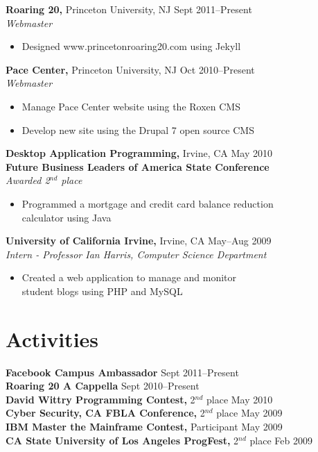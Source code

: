 \documentclass[margin]{res}
\begin{document}
\begin{resume}
 {\bf Roaring 20,} Princeton University, NJ \hfill Sept 2011--Present \\
 {\it Webmaster}
 \begin{itemize} \itemsep -2pt  %
 \item Designed www.princetonroaring20.com using Jekyll
 \end{itemize}

 {\bf Pace Center,} Princeton University, NJ \hfill Oct 2010--Present \\
 {\it Webmaster}
 \begin{itemize} \itemsep -2pt  %
 \item Manage Pace Center website using the Roxen CMS
 \item Develop new site using the Drupal 7 open source CMS
 \end{itemize}
 
 {\bf Desktop Application Programming,} Irvine, CA \hfill May 2010 \\
 {\bf Future Business Leaders of America State Conference} \\
 {\it Awarded 2$^{nd}$ place}
 \begin{itemize} \itemsep -2pt  %
 \item Programmed a mortgage and credit card balance reduction \\ 
   calculator using Java
 \end{itemize}

 {\bf University of California Irvine,} Irvine, CA \hfill May--Aug
 2009 \\
 {\it Intern - Professor Ian Harris, Computer Science Department}
 \begin{itemize} \itemsep -2pt  %
 \item Created a web application to manage and monitor \\
   student blogs using PHP and MySQL 
 \end{itemize}


 
\section{Activities}
 {\bf Facebook Campus Ambassador} \hfill Sept 2011--Present \\
 {\bf Roaring 20 A Cappella} \hfill Sept 2010--Present \\
 {\bf David Wittry Programming Contest,} 2$^{nd}$ place \hfill May 2010 \\
 {\bf Cyber Security, CA FBLA Conference,} 2$^{nd}$ place \hfill May 2009 \\
 {\bf IBM Master the Mainframe Contest,} Participant \hfill May 2009 \\
 {\bf CA State University of Los Angeles ProgFest,}
 2$^{nd}$ place \hfill Feb 2009

\end{resume}
\end{document}
